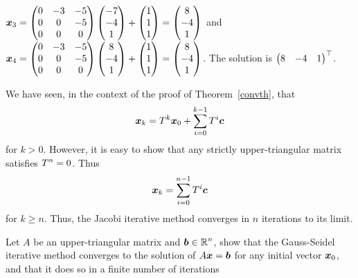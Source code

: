 {$\displaystyle \bm{x}_3 =
\begin{pmatrix} 0 & -3 & -5 \\ 0 & 0 & -5 \\ 0 & 0 & 0 \end{pmatrix}
\begin{pmatrix} -7 \\ -4 \\ 1 \end{pmatrix} +
\begin{pmatrix} 1 \\ 1 \\ 1 \end{pmatrix} =
\begin{pmatrix} 8 \\ -4 \\ 1 \end{pmatrix}$ and
$\displaystyle \bm{x}_4 =
\begin{pmatrix} 0 & -3 & -5 \\ 0 & 0 & -5 \\ 0 & 0 & 0 \end{pmatrix}
\begin{pmatrix} 8 \\ -4 \\ 1 \end{pmatrix} +
\begin{pmatrix} 1 \\ 1 \\ 1 \end{pmatrix} =
\begin{pmatrix} 8 \\ -4 \\ 1 \end{pmatrix}$.
The solution is
$\displaystyle \begin{pmatrix} 8 & -4 & 1 \end{pmatrix}^\top$.

 We have seen, in the context of the proof of
Theorem~\ref{convth}, that
\[
  \bm{x}_k = T^k \bm{x}_0 + \sum_{i=0}^{k-1} T^i \bm{c}
\]
for $k>0$.  However, it is easy to show that any \nn strictly
upper-triangular matrix satisfies $\displaystyle T^n = 0$.  Thus
\[
  \bm{x}_k = \sum_{i=0}^{n-1} T^i \bm{c}
\]
for $k\geq n$.  Thus, the Jacobi iterative method converges in 
$n$ iterations to its limit.
}

\begin{question}
Let $A$ be an \nn upper-triangular matrix and
$\displaystyle \bm{b}\in \mathbb{R}^n$, show
that the Gauss-Seidel iterative method converges to the solution of
$A\bm{x} = \bm{b}$ for any initial vector $\bm{x}_0$, and that it
does so in a finite number of iterations
\end{question}

